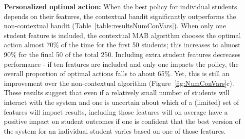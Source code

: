 \textbf{Personalized optimal action:} When the best policy for individual students depends on their features, the contextual bandit significantly outperforms the non-contextual bandit (Table~\ref{table:resultsNumConVars}). When only one student feature is included, the contextual MAB algorithm chooses the optimal action almost 70\% of the time for the first 50 students; this increases to almost 90\% for the final 50 of the total 250. Including extra student features decreases performance - if ten features are included and only one impacts the policy, the overall proportion of optimal actions falls to about 65\%. Yet, this is still an improvement over the non-contextual algorithm (Figure~\ref{fig:NumConVars}c).
These results suggest that even if a relatively small number of students will interact with the system and one is uncertain about which of a (limited) set of features will impact results, including those features will on average have a positive impact on student outcomes if one is confident that the best version of the system for an individual student varies based on one of those features.



